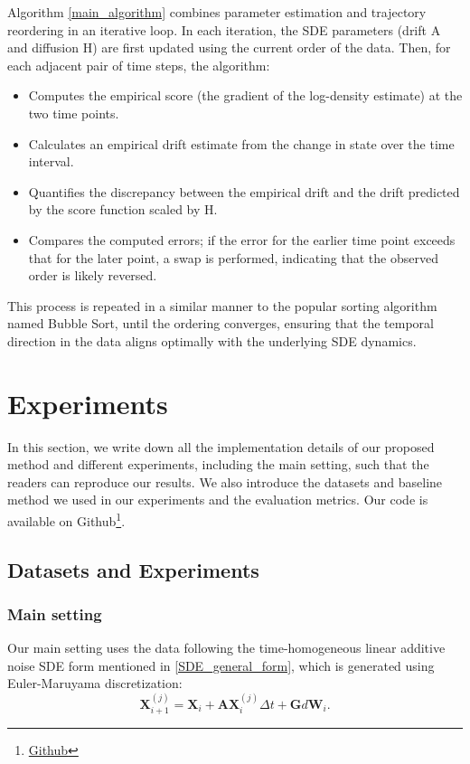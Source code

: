 \documentclass[conference]{IEEEtran}
\begin{document}
Algorithm \ref{main_algorithm} combines parameter estimation and trajectory reordering in an iterative loop. In each iteration, the SDE parameters
(drift A and diffusion H) are first updated using the current order of the data. Then, for each adjacent pair of time steps, the algorithm:

\begin{itemize}
    \item Computes the empirical score (the gradient of the log-density estimate) at the two time points.
    \item Calculates an empirical drift estimate from the change in state over the time interval.
    \item Quantifies the discrepancy between the empirical drift and the drift predicted by the score function scaled by H.
    \item Compares the computed errors; if the error for the earlier time point exceeds that for the later point, a swap is performed,
    indicating that the observed order is likely reversed.
\end{itemize}

This process is repeated in a similar manner to the popular sorting algorithm named Bubble Sort, until the ordering converges, ensuring that
the temporal direction in the data aligns optimally with the underlying SDE dynamics.

\section{Experiments}
In this section, we write down all the implementation details of our proposed method and different experiments, including the main setting, such that the readers can reproduce our results. We also introduce the datasets and baseline method
we used in our experiments and the evaluation metrics. Our code is available on Github\footnote{\href{https://github.com/longsc2603/First_paper_notes/tree/main/experiment}{Github}}.

\subsection{Datasets and Experiments}
\subsubsection{Main setting}
Our main setting uses the data following the time-homogeneous linear additive noise SDE form mentioned in \eqref{SDE_general_form}, which is generated using Euler-Maruyama discretization:
\[
    \mathbf{X}_{i+1}^{(j)} = \mathbf{X}_i +  \mathbf{AX}_i^{(j)}\Delta t + \mathbf{G}d\mathbf{W}_i.
\]
\end{document}
